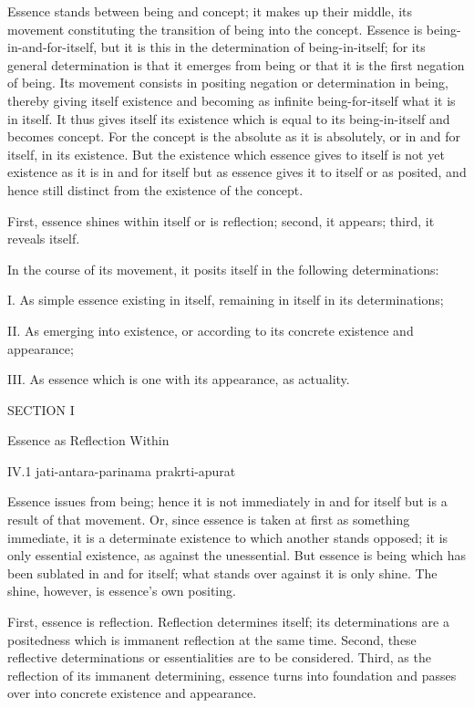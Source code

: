 Essence stands between being and concept;
it makes up their middle,
its movement constituting the transition
of being into the concept.
Essence is being-in-and-for-itself,
but it is this in the determination of being-in-itself;
for its general determination is that it emerges from being
or that it is the first negation of being.
Its movement consists in positing negation
or determination in being,
thereby giving itself existence
and becoming as infinite being-for-itself
what it is in itself.
It thus gives itself its existence
which is equal to its being-in-itself
and becomes concept.
For the concept is the absolute
as it is absolutely,
or in and for itself,
in its existence.
But the existence which essence gives to itself is
not yet existence as it is in and for itself
but as essence gives it to itself or as posited,
and hence still distinct from the existence of the concept.

First, essence shines within itself
or is reflection;
second, it appears;
third, it reveals itself.

In the course of its movement,
it posits itself in the following determinations:

I. As simple essence existing in itself,
remaining in itself in its determinations;

II. As emerging into existence,
or according to its concrete existence and appearance;

III. As essence which is one with its appearance,
as actuality.

SECTION I

Essence as Reflection Within

IV.1
jati-antara-parinama prakrti-apurat

Essence issues from being;
hence it is not immediately in and for itself
but is a result of that movement.
Or, since essence is taken at first as something immediate,
it is a determinate existence to which another stands opposed;
it is only essential existence, as against the unessential.
But essence is being which has been sublated in and for itself;
what stands over against it is only shine.
The shine, however, is essence's own positing.

First, essence is reflection.
Reflection determines itself;
its determinations are a positedness
which is immanent reflection at the same time.
Second, these reflective determinations
or essentialities are to be considered.
Third, as the reflection of its immanent determining,
essence turns into foundation and passes over
into concrete existence and appearance.

